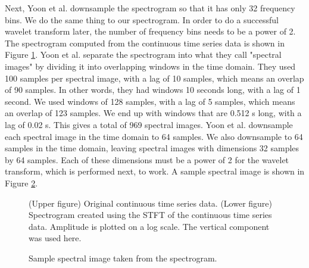 \newline
Next, Yoon et al. downsample the spectrogram so that it has only 32 frequency bins. We do the same thing to our spectrogram. In order to do a successful wavelet transform later, the number of frequency bins needs to be a power of 2. The spectrogram computed from the continuous time series data is shown in Figure \ref{fig:spec}.
\newline
Yoon et al. separate the spectrogram into what they call "spectral images" by dividing it into overlapping windows in the time domain. They used 100 samples per spectral image, with a lag of 10 samples, which means an overlap of 90 samples. In other words, they had windows 10 seconds long, with a lag of 1 second. We used windows of 128 samples, with a lag of 5 samples, which means an overlap of 123 samples. We end up with windows that are 0.512 s long, with a lag of 0.02 s. This gives a total of 969 spectral images.
\newline
Yoon et al. downsample each spectral image in the time domain to 64 samples. We also downsample to 64 samples in the time domain, leaving spectral images with dimensions 32 samples by 64 samples. Each of these dimensions must be a power of 2 for the wavelet transform, which is performed next, to work. A sample spectral image is shown in Figure \ref{fig:specim}. 
\begin{figure}
\epsfysize=50mm 
\caption{(Upper figure) Original continuous time series data. (Lower figure) Spectrogram created using the STFT of the continuous time series data. Amplitude is plotted on a log scale. The vertical component was used here.}
\label{fig:spec}
\end{figure}
\begin{figure}
\epsfysize=50mm 
\caption{Sample spectral image taken from the spectrogram.}
\label{fig:specim}
\end{figure}
